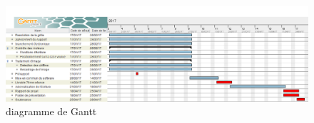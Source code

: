 \documentclass[11pt]{article}
\begin{document}
\begin{figure}[!h]
	\centering
   	\includegraphics[scale = 0.38]{gantt.png}
   	\caption{\label{gantt} diagramme de Gantt }
\end{figure}
\end{document}
